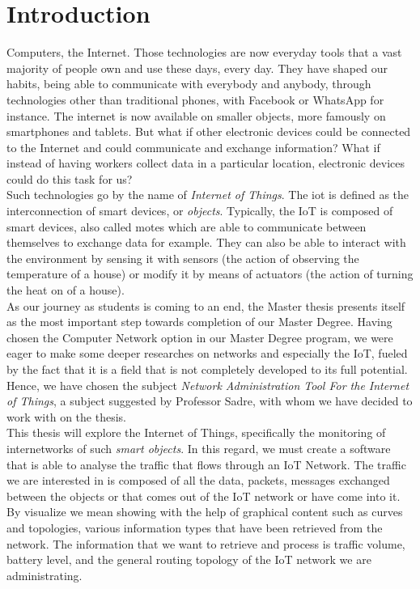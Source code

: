 \chapter*{Introduction}


Computers, the Internet. Those technologies are now everyday tools that a vast majority of people own and use these days, every day. They have shaped our habits, being able to communicate with everybody and anybody, through technologies other than traditional phones, with Facebook or WhatsApp for instance. The internet is now available on smaller objects, more famously on smartphones and tablets. But what if other electronic devices could be connected to the Internet and could communicate and exchange information? What if instead of having workers collect data in a particular location, electronic devices could do this task for us?\\

Such technologies go by the name of \textit{Internet of Things}. The \acrfull{iot} is defined as the interconnection of smart devices, or \textit{objects}. Typically, the IoT is composed of smart devices, also called motes which are able to communicate between themselves to exchange data for example. They can also be able to interact with the environment by sensing it with sensors (the action of observing the temperature of a house) or modify it by means of actuators (the action of turning the heat on of a house).\\

As our journey as students is coming to an end, the Master thesis presents itself as the most important step towards completion of our Master Degree.  Having chosen the Computer Network option in our Master Degree program, we were eager to make some deeper researches on networks and especially the IoT, fueled by the fact that it is a field that is not completely developed to its full potential. Hence, we have chosen the subject \textit{Network Administration Tool For the Internet of Things}, a subject suggested by Professor Sadre, with whom we have decided to work with on the thesis. \\

This thesis will explore the Internet of Things, specifically the monitoring of internetworks of such \textit{smart objects}.  In this regard, we must create a software that is able to analyse the traffic that flows through an IoT Network. The traffic we are interested in is composed of all the data, packets, messages exchanged between the objects or that comes out of the IoT network or have come into it. By visualize we mean showing with the help of graphical content such as curves and topologies, various information types that have been retrieved from the network. The information that we want to retrieve and process is traffic volume, battery level, and the general routing topology of the IoT network we are administrating.

